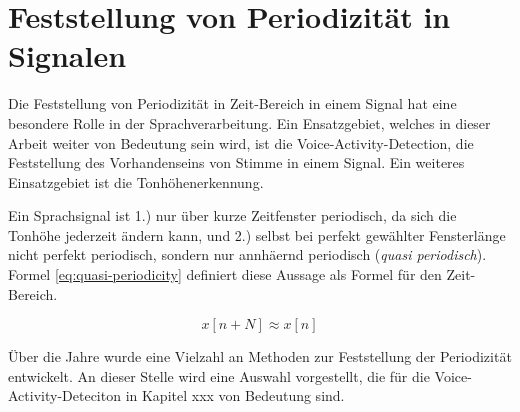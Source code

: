 \section{Feststellung von Periodizität in Signalen}

Die Feststellung von Periodizität in Zeit-Bereich in einem Signal hat eine besondere Rolle in der Sprachverarbeitung. Ein Ensatzgebiet, welches in dieser Arbeit weiter von Bedeutung sein wird, ist die Voice-Activity-Detection, die Feststellung des Vorhandenseins von Stimme in einem Signal. \cite{vad_Lisboa} Ein weiteres Einsatzgebiet ist die Tonhöhenerkennung. \cite{pitch-paper-overview}  \cite[S. 1 - 2]{pitchHistory}

Ein Sprachsignal ist 1.) nur über kurze Zeitfenster periodisch, da sich die Tonhöhe jederzeit ändern kann, und 2.) selbst bei \glqq perfekt gewählter Fensterlänge\grqq{} nicht perfekt periodisch, sondern nur annhäernd periodisch (\emph{quasi periodisch}).\cite[S. 1 - 2]{pitchHistory} Formel \ref{eq:quasi-periodicity} definiert diese Aussage als Formel für den Zeit-Bereich.

\begin{equation}
 x[n+N] \approx x[n]
\label{eq:quasi-periodicity}
\end{equation}

Über die Jahre wurde eine Vielzahl an Methoden zur Feststellung der Periodizität entwickelt. An dieser Stelle wird eine Auswahl vorgestellt, die für die Voice-Activity-Deteciton in Kapitel xxx von Bedeutung sind.





